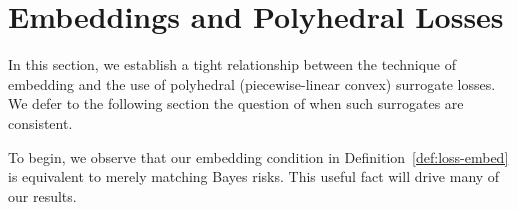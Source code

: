 \documentclass[12pt]{article}
\newcommand{\Comments}{1}
\newcommand{\mynote}[2]{\ifnum\Comments=1\textcolor{#1}{#2}\fi}
\newcommand{\raf}[1]{\mynote{green}{[RF: #1]}}
\newcommand{\simplex}{\Delta_\Y}
\newcommand{\R}{\mathcal{R}}
\newcommand{\Y}{\mathcal{Y}}
\newcommand{\risk}[1]{\underline{#1}}
\newcommand{\inprod}[2]{\langle #1, #2 \rangle}%
\newcommand{\hinge}{L_{\mathrm{hinge}}}
\newcommand{\ellzo}{\ell_{\text{0-1}}}
\DeclareMathOperator*{\argmax}{arg\,max}
\begin{document}











\section{Embeddings and Polyhedral Losses}
\label{sec:poly-loss-embed}

In this section, we establish a tight relationship between the technique of embedding and the use of polyhedral (piecewise-linear convex) surrogate losses.
We defer to the following section the question of when such surrogates are consistent.

To begin, we observe that our embedding condition in Definition~\ref{def:loss-embed} is equivalent to merely matching Bayes risks.
This useful fact will drive many of our results.
\end{document}
